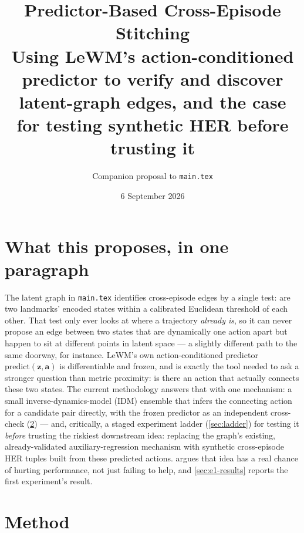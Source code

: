 \documentclass[11pt]{article}
\title{\vspace{-2em}\textbf{Predictor-Based Cross-Episode Stitching}\\[0.3em]
\large Using LeWM's action-conditioned predictor to verify and discover latent-graph edges,
and the case for testing synthetic HER before trusting it}
\author{Companion proposal to \texttt{main.tex}}
\date{6 September 2026}
\newcommand{\zv}{\mathbf{z}}
\begin{document}
\maketitle
\vspace{-1.5em}

\section{What this proposes, in one paragraph}

The latent graph in \texttt{main.tex} identifies cross-episode edges by a single test: are two
landmarks' encoded states within a calibrated Euclidean threshold of each other. That test only
ever looks at where a trajectory \emph{already is}, so it can never propose an edge between two
states that are dynamically one action apart but happen to sit at different points in latent
space --- a slightly different path to the same doorway, for instance. LeWM's own
action-conditioned predictor $\mathrm{predict}(\zv,\mathbf{a})$ is differentiable and frozen, and
is exactly the tool needed to ask a stronger question than metric proximity: is there an action
that actually connects these two states. The current methodology answers that with one
mechanism: a small inverse-dynamics-model (IDM) ensemble that infers the connecting action for
a candidate pair directly, with the frozen predictor as an independent cross-check
(\cref{sec:method}) --- and, critically, a staged experiment ladder (\cref{sec:ladder}) for
testing it \emph{before} trusting the riskiest downstream idea: replacing the graph's existing,
already-validated auxiliary-regression mechanism with synthetic cross-episode HER tuples built
from these predicted actions.  argues that idea has a real chance of hurting
performance, not just failing to help, and \cref{sec:e1-results} reports the first experiment's
result.

\section{Method}
\label{sec:method}
\end{document}
